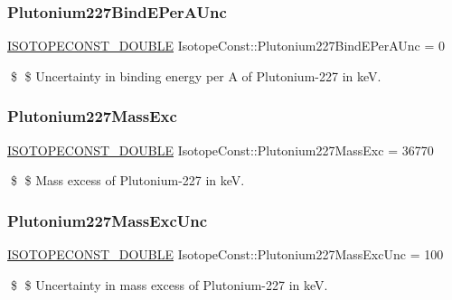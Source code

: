 \subsubsection{\texorpdfstring{Plutonium227\+Bind\+E\+Per\+A\+Unc}{Plutonium227BindEPerAUnc}}
{\footnotesize\ttfamily \mbox{\hyperlink{group___isotope_const-_macros_ga8f45a7272ce02c0b4c65c44636ed719a}{I\+S\+O\+T\+O\+P\+E\+C\+O\+N\+S\+T\+\_\+\+D\+O\+U\+B\+LE}} Isotope\+Const\+::\+Plutonium227\+Bind\+E\+Per\+A\+Unc = 0}

\$ \$ Uncertainty in binding energy per A of Plutonium-\/227 in keV. \mbox{\label{group___isotope_const-_plutonium-_pu227_gac644299cdc8e73216b31b603eb347e20}} 
\subsubsection{\texorpdfstring{Plutonium227\+Mass\+Exc}{Plutonium227MassExc}}
{\footnotesize\ttfamily \mbox{\hyperlink{group___isotope_const-_macros_ga8f45a7272ce02c0b4c65c44636ed719a}{I\+S\+O\+T\+O\+P\+E\+C\+O\+N\+S\+T\+\_\+\+D\+O\+U\+B\+LE}} Isotope\+Const\+::\+Plutonium227\+Mass\+Exc = 36770}

\$ \$ Mass excess of Plutonium-\/227 in keV. \mbox{\label{group___isotope_const-_plutonium-_pu227_ga1d04fc6ae9d69828b6efa229cd6569f2}} 
\subsubsection{\texorpdfstring{Plutonium227\+Mass\+Exc\+Unc}{Plutonium227MassExcUnc}}
{\footnotesize\ttfamily \mbox{\hyperlink{group___isotope_const-_macros_ga8f45a7272ce02c0b4c65c44636ed719a}{I\+S\+O\+T\+O\+P\+E\+C\+O\+N\+S\+T\+\_\+\+D\+O\+U\+B\+LE}} Isotope\+Const\+::\+Plutonium227\+Mass\+Exc\+Unc = 100}

\$ \$ Uncertainty in mass excess of Plutonium-\/227 in keV. \mbox{\label{group___isotope_const-_plutonium-_pu227_ga00aade85aabf984db063d71373e7d837}} 
